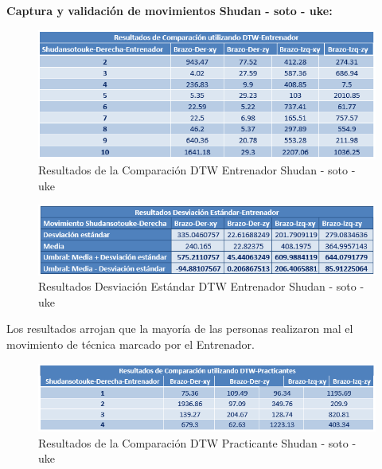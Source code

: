 \clearpage
\textbf{Captura y validación de movimientos Shudan - soto - uke:}\\
\begin{figure}[H]%
	\begin{center}
		\includegraphics[scale=1]{./Figuras/Implementacion/Pruebas/Tablas/ResultadosDTW_Entrenador_Shudansotouke}
	\end{center}
	\caption{Resultados de la Comparación DTW Entrenador Shudan - soto - uke}
	\label{fig:ResultadosDTW_Entrenador_Shudansotouke}
\end{figure}
\begin{figure}[H]%
	\begin{center}
		\includegraphics[scale=1]{./Figuras/Implementacion/Pruebas/Tablas/ResultadorDesvEstandar_Entrenador_Shudansotouke}
	\end{center}
	\caption{Resultados Desviación Estándar DTW Entrenador Shudan - soto - uke}
	\label{fig:ResultadorDesvEstandar_Entrenador_Shudansotouke}
\end{figure}
Los resultados arrojan que la mayoría de las personas realizaron mal el movimiento de técnica marcado por el Entrenador.
\begin{figure}[H]%
	\begin{center}
		\includegraphics[scale=1]{./Figuras/Implementacion/Pruebas/Tablas/ResultadosDTW_Practicantes_Shudansotouke}
	\end{center}
	\caption{Resultados de la Comparación DTW Practicante Shudan - soto - uke}
	\label{fig:ResultadosDTW_Practicantes_Shudansotouke}
\end{figure}
